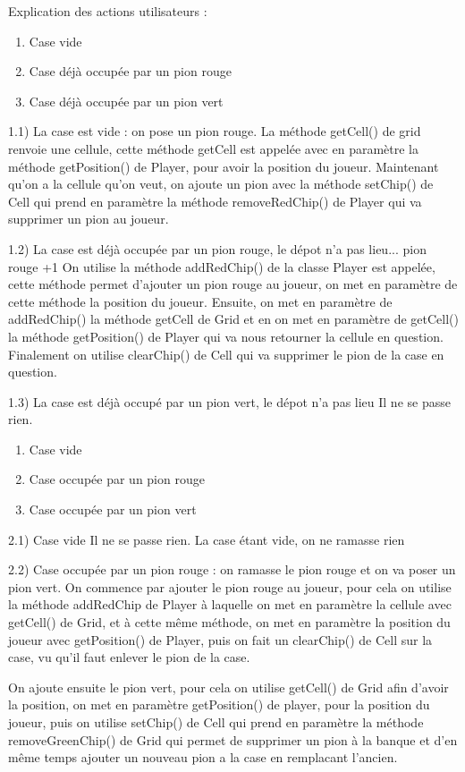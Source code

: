 Explication des actions utilisateurs : 
\begin{enumerate}{Poser un pion}
	\item Case vide
	\item Case déjà occupée par un pion rouge
	\item Case déjà occupée par un pion vert
\end{enumerate}

1.1) La case est vide : on pose un pion rouge.
La méthode getCell() de grid renvoie une cellule, cette méthode getCell est appelée avec en paramètre la méthode getPosition() de Player, pour avoir la position du joueur.
Maintenant qu'on a la cellule qu'on veut, on ajoute un pion avec la méthode setChip() de Cell qui prend en paramètre la méthode removeRedChip() de Player qui va supprimer un pion au joueur.

1.2) La case est déjà occupée par un pion rouge, le dépot n'a pas lieu... pion rouge +1
On utilise la méthode addRedChip() de la classe Player est appelée, cette méthode permet d'ajouter un pion rouge au joueur, on met en paramètre de cette méthode la position du joueur. Ensuite, on met en paramètre de addRedChip() la méthode getCell de Grid et en on met en paramètre de getCell() la méthode getPosition() de Player qui va nous retourner la cellule en question.
Finalement on utilise clearChip() de Cell qui va supprimer le pion de la case en question.

1.3) La case est déjà occupé par un pion vert, le dépot n'a pas lieu
Il ne se passe rien.

\begin{enumerate}{Ramasser un pion}
	\item Case vide
	\item Case occupée par un pion rouge
	\item Case occupée par un pion vert
\end{enumerate}

2.1) Case vide
Il ne se passe rien. La case étant vide, on ne ramasse rien

2.2) Case occupée par un pion rouge : on ramasse le pion rouge et on va poser un pion vert.
On commence par ajouter le pion rouge au joueur, pour cela on utilise la méthode addRedChip de Player à laquelle on met en paramètre la cellule avec getCell() de Grid, et à cette même méthode,
on met en paramètre la position du joueur avec getPosition() de Player, puis on fait un clearChip() de Cell sur la case, vu qu'il faut enlever le pion de la case.

On ajoute ensuite le pion vert, pour cela on utilise getCell() de Grid afin d'avoir la position,
on met en paramètre getPosition() de player, pour la position du joueur, puis on utilise setChip() de Cell qui prend en paramètre la méthode removeGreenChip() de Grid qui permet de supprimer un pion à la banque et d'en même temps ajouter un nouveau pion a la case en remplacant l'ancien.
	 



